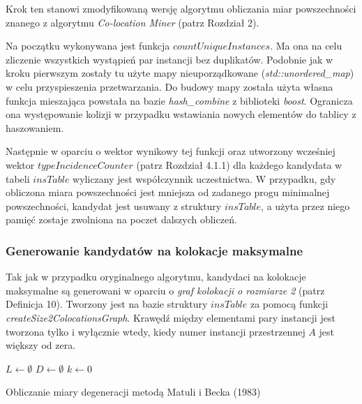 \documentclass[12pt]{article}
\begin{document}
Krok ten stanowi zmodyfikowaną wersję algorytmu obliczania miar powszechności znanego z algorytmu \textit{Co-location Miner} (patrz Rozdział 2).

Na początku wykonywana jest funkcja $ countUniqueInstances$. Ma ona na celu zliczenie wszystkich wystąpień par instancji bez duplikatów. Podobnie jak w kroku pierwszym zostały tu użyte mapy nieuporządkowane (\textit{std::unordered\_map}) w celu przyspieszenia przetwarzania. Do budowy mapy została użyta własna funkcja mieszająca powstała na bazie \textit{hash\_combine} z biblioteki \textit{boost}. Ogranicza ona występowanie kolizji w przypadku wstawiania nowych elementów do tablicy z haszowaniem.

Następnie w oparciu o wektor wynikowy tej funkcji oraz utworzony wcześniej wektor $ typeIncidenceCounter$ (patrz Rozdział 4.1.1) dla każdego kandydata w tabeli $ insTable $ wyliczany jest współczynnik uczestnictwa. W przypadku, gdy obliczona miara powszechności jest mniejsza od zadanego progu minimalnej powszechności, kandydat jest usuwany z struktury $ insTable $, a użyta przez niego pamięć zostaje zwolniona na poczet dalszych obliczeń.

\subsubsection{Generowanie kandydatów na kolokacje maksymalne}

Tak jak w przypadku oryginalnego algorytmu, kandydaci na kolokacje maksymalne są generowani w oparciu o \textit{graf kolokacji o rozmiarze 2} (patrz Definicja 10). Tworzony jest na bazie struktury $ insTable $ za pomocą funkcji \textit{createSize2ColocationsGraph}. Krawędź między elementami pary instancji jest tworzona tylko i wyłącznie wtedy, kiedy numer instancji przestrzennej $ A $ jest większy od zera. 

\begin{algorithm}
$L \leftarrow \emptyset$\; 
$D \leftarrow \emptyset$\;
$k \leftarrow 0$\;
\caption{Obliczanie miary degeneracji metodą Matuli i Becka (1983)}
\end{algorithm}
\end{document}
